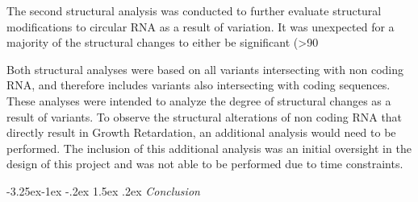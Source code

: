 \documentclass[11pt]{article}
\makeatletter
\renewcommand\subsection{\@startsection{subsection}{2}{\z@}%
                                         {-3.25ex\@plus -1ex \@minus -.2ex}%
                                         {1.5ex \@plus .2ex}%
                                         {\normalfont\fontfamily{phv}\fontsize{14}{17}\bfseries}}
\makeatother
\begin{document}
The second structural analysis was conducted to further evaluate structural modifications to circular RNA as a result of variation. It was unexpected for a majority of the structural changes to either be significant (>90%

Both structural analyses were based on all variants intersecting with non coding RNA, and therefore includes variants also intersecting with coding sequences. These analyses were intended to analyze the degree of structural changes as a result of variants. To observe the structural alterations of non coding RNA that directly result in Growth Retardation, an additional analysis would need to be performed. The inclusion of this additional analysis was an initial oversight in the design of this project and was not able to be performed due to time constraints. 

\subsection{
\emph{Conclusion}} \label{s:conclusion}
\end{document}
